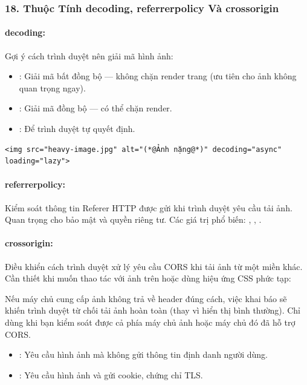 \subsubsection{18. Thuộc Tính decoding, referrerpolicy Và crossorigin}

\paragraph{decoding:}
Gợi ý cách trình duyệt nên giải mã hình ảnh:
\begin{itemize}[leftmargin=1.5em, itemsep=2pt, parsep=0pt]
    \item {}: Giải mã bất đồng bộ — không chặn render trang (ưu tiên cho ảnh không quan trọng ngay).
    \item {}: Giải mã đồng bộ — có thể chặn render.
    \item {}: Để trình duyệt tự quyết định.
\end{itemize}

\begin{codeWindow}
\begin{lstlisting}[language=HTML5]
<img src="heavy-image.jpg" alt="(*@Ảnh nặng@*)" decoding="async" loading="lazy">
\end{lstlisting}
\end{codeWindow}

\paragraph{referrerpolicy:}
Kiểm soát thông tin Referer HTTP được gửi khi trình duyệt yêu cầu tải ảnh. Quan trọng cho bảo mật và quyền riêng tư. Các giá trị phổ biến: , , .

\paragraph{crossorigin:}
Điều khiển cách trình duyệt xử lý yêu cầu CORS khi tải ảnh từ một miền khác. Cần thiết khi muốn thao tác với ảnh trên  hoặc dùng hiệu ứng CSS phức tạp:

\begin{warnBox}
Nếu máy chủ cung cấp ảnh không trả về header  đúng cách, việc khai báo  sẽ khiến trình duyệt từ chối tải ảnh hoàn toàn (thay vì hiển thị bình thường). Chỉ dùng  khi bạn kiểm soát được cả phía máy chủ ảnh hoặc máy chủ đó đã hỗ trợ CORS.
\end{warnBox}
\begin{itemize}[leftmargin=1.5em, itemsep=2pt, parsep=0pt]
    \item {}: Yêu cầu hình ảnh mà không gửi thông tin định danh người dùng.
    \item {}: Yêu cầu hình ảnh và gửi cookie, chứng chỉ TLS.
\end{itemize}


